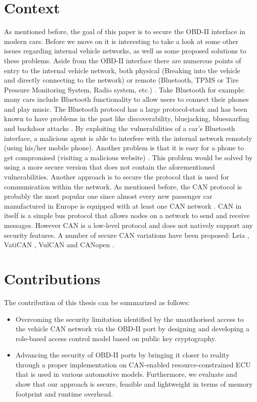 \section{Context}
As mentioned before, the goal of this paper is to secure the OBD-II interface in modern cars. Before we move on it is interesting to take a look at some other issues regarding internal vehicle networks, as well as some proposed solutions to these problems. Aside from the OBD-II interface there are numerous points of entry to the internal vehicle network, both physical (Breaking into the vehicle and directly connecting to the network) or remote (Bluetooth, TPMS or Tire Pressure Monitoring System, Radio system, etc.) \cite{MillerA}. Take Bluetooth for example: many cars include Bluetooth functionality to allow users to connect their phones and play music. The Bluetooth protocol has a large protocol-stack and has been known to have problems in the past \cite{MillerA} like discoverability, bluejacking, bluesnarfing and backdoor attacks \cite{Bluetooth}. By exploiting the vulnerabilities of a car's Bluetooth interface, a malicious agent is able to interfere with the internal network remotely (using his/her mobile phone). Another problem is that it is easy for a phone to get compromised (visiting a malicious website) \cite{Yadav16}. This problem would be solved by using a more secure version that does not contain the aforementioned vulnerabilities.\newline 
\newline
Another approach is to secure the protocol that is used for communication within the network. As mentioned before, the CAN protocol is probably the most popular one since almost every new passenger car manufactured in Europe is equipped with at least one CAN network \cite{CANhistory}. CAN in itself is a simple bus protocol that allows nodes on a network to send and receive messages. However CAN is a low-level protocol and does not natively support any security features. A number of secure CAN variations have been proposed: Leia \cite{Leia}, VatiCAN \cite{VatiCAN}, VulCAN \cite{VulCAN} and CANopen \cite{Pfeiffer}.

\section{Contributions}
\label{sec:contributions}

The contribution of this thesis can be summarized as follows:

\begin{itemize}
	\item Overcoming the security limitation identified by the unauthorised access to the vehicle CAN network via the OBD-II port by designing and developing a role-based access control model based on public key cryptography.
	
	\item Advancing the security of OBD-II ports by bringing it closer to reality through a proper implementation on CAN-enabled resource-constrained ECU that is used in various automotive models. Furthermore, we evaluate and show that our approach is secure, feasible and lightweight in terms of memory footprint and runtime overhead.
\end{itemize} 